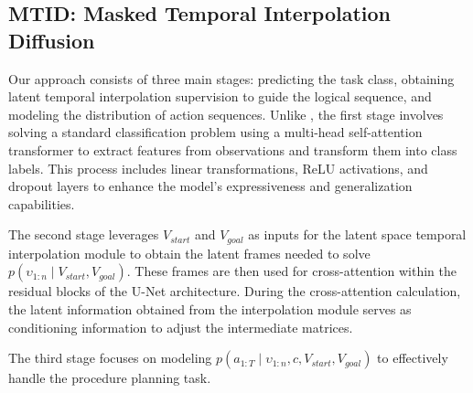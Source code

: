 \subsection{MTID: Masked Temporal Interpolation Diffusion}
\label{method2} 
Our approach consists of three main stages: predicting the task class, obtaining latent temporal interpolation supervision to guide the logical sequence, and modeling the distribution of action sequences. Unlike \citet{wang2023pdpp}, the first stage involves solving a standard classification problem using a multi-head self-attention transformer to extract features from observations and transform them into class labels. This process includes linear transformations, ReLU activations, and dropout layers to enhance the model's expressiveness and generalization capabilities.

The second stage leverages \(V_{start}\) and \(V_{goal}\) as inputs for the latent space temporal interpolation module to obtain the latent frames needed to solve \(p(\upsilon_{1:n} \mid V_{start}, V_{goal})\). These frames are then used for cross-attention within the residual blocks of the U-Net architecture. During the cross-attention calculation, the latent information obtained from the interpolation module serves as conditioning information to adjust the intermediate matrices.

The third stage focuses on modeling \(p(a_{1:T} \mid \upsilon_{1:n}, c, V_{start}, V_{goal})\) to effectively handle the procedure planning task.





